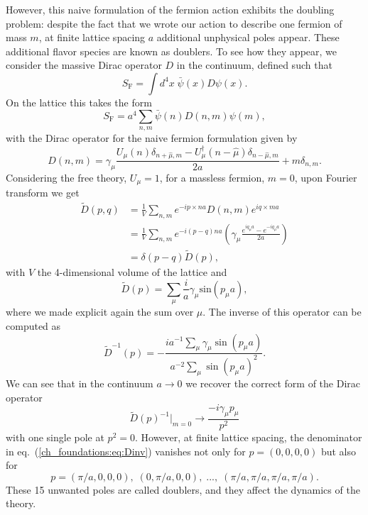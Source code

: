 However, this naive formulation of the fermion action exhibits the doubling problem: despite the fact that we wrote our action to describe one fermion of mass $m$, at finite lattice spacing $a$ additional unphysical poles appear. These additional flavor species are known as doublers. To see how they appear, we consider the massive Dirac operator $D$ in the continuum, defined such that
\begin{equation}
S_{\textrm{F}}=\int d^4x\;\bar{\psi}(x)D\psi(x).
\end{equation}
On the lattice this takes the form
\begin{equation}
S_{\textrm{F}}=a^4\sum_{n,m}\bar{\psi}(n)D(n,m)\psi(m),
\end{equation}
with the Dirac operator for the naive fermion formulation given by
\begin{equation}
D(n,m)=\gamma_{\mu}\frac{U_{\mu}(n)\delta_{n+\hat{\mu},m}-U_{\mu}^{\dagger}(n-\hat{\mu})\delta_{n-\hat{\mu},m}}{2a}+m\delta_{n,m}.
\end{equation}
Considering the free theory, $U_{\mu}=1$, for a massless fermion, $m=0$, upon Fourier transform we get
\begin{align}
\tilde{D}(p,q)&=\frac{1}{V}\sum_{n,m}e^{-ip\times na}D(n,m)e^{iq\times ma}\\
&=\frac{1}{V}\sum_{n,m}e^{-i(p-q)na}\left(\gamma_{\mu}\frac{e^{iq_{\mu}a}-e^{-iq_{\mu}a}}{2a}\right)\\
&=\delta(p-q)\tilde{D}(p),
\end{align}
with $V$ the 4-dimensional volume of the lattice and
\begin{equation}
\tilde{D}(p)=\sum_{\mu}\frac{i}{a}\gamma_{\mu}\textrm{sin}(p_{\mu}a),
\end{equation}
where we made explicit again the sum over $\mu$. The inverse of this operator can be computed as
\begin{equation}
\label{ch_foundations:eq:Dinv}
\tilde{D}^{-1}(p)=-\frac{ia^{-1}\sum_{\mu}\gamma_{\mu}\sin(p_{\mu}a)}{a^{-2}\sum_{\mu}\sin(p_{\mu}a)^2}.
\end{equation}
We can see that in the continuum $a\rightarrow0$ we recover the correct form of the Dirac operator
\begin{equation}
\tilde{D}(p)^{-1}|_{m=0}\rightarrow\frac{-i\gamma_{\mu}p_{\mu}}{p^2}
\end{equation}
with one single pole at $p^2=0$. However, at finite lattice spacing, the denominator in eq.~(\ref{ch_foundations:eq:Dinv}) vanishes not only for $p=(0,0,0,0)$ but also for 
\begin{equation}
p=(\pi/a,0,0,0),\;(0,\pi/a,0,0),\;...,\;(\pi/a,\pi/a,\pi/a,\pi/a).
\end{equation}
These 15 unwanted poles are called doublers, and they affect the dynamics of the theory. 

